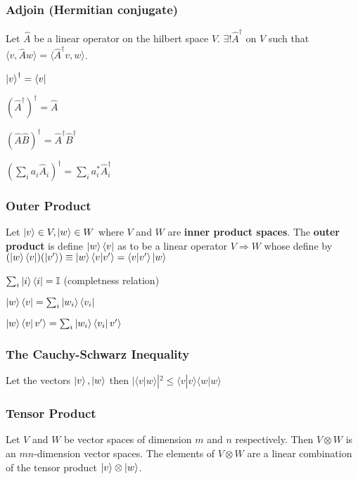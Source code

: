 \documentclass[5pt]{article}
\begin{document}
\begin{multicols}{3}
\subsubsection{Adjoin \small{(Hermitian conjugate)}}
Let $\hat{A}$ be a linear operator on the hilbert space $V$. 
$\exists! \hat{A}^\dagger$ on $V$ such that $\langle v, \hat{A}w\rangle=\langle\hat{A}^\dagger v, w\rangle$.

\begin{properties}
     \begin{itemize*}
          \item $\ket{v}^\dag=\bra{v}\;$
          \item $(\hat{A}^\dag)^\dag=\hat{A}$
          \item $(\hat{A}\hat{B})^\dagger=\hat{A}^\dagger\hat{B}^\dagger\;\:$     
          \item $(\sum_ia_i\hat{A}_i)^\dag=\sum_i a_i^*\hat{A}_i^\dag$
     \end{itemize*}
\end{properties}

\subsubsection{Outer Product}
Let $\ket{v}\in V, \ket{w}\in W$ where $V$ and $W$ are \textbf{inner product spaces}.
The \textbf{outer product} is define $\ket{w}\bra{v}$ as to be a linear operator $V\Rightarrow W$ whose define by
$(\ket{w}\bra{v})(\ket{v'})\equiv\ket{w}\langle v|v'\rangle=\langle v|v'\rangle\ket{w}$\\
\begin{properties}
     \begin{itemize*}
          \item $\sum_i\ket{i}\bra{i}=\mathbb{I}$ (completness relation)
          \item $\ket{w}\bra{v}=\sum_i\ket{w_i}\bra{v_i}$
          \item $\ket{w}\bra{v} v'\rangle =\sum_i\ket{w_i}\bra{v_i}v'\rangle$
     \end{itemize*}
\end{properties}

\subsubsection{The Cauchy-Schwarz Inequality}
Let the vectors $\ket{v},\ket{w}$ then $|\langle v|w\rangle|^2\leq \langle v|v\rangle\langle w|w\rangle$


\subsubsection{Tensor Product}
Let $V$ and $W$ be vector spaces of dimension $m$ and $n$ respectively.
Then $V\otimes W$ is an $mn$-dimension vector spaces. 
The elements of $V\otimes W$ are a linear combination of the tensor product $\ket{v}\otimes\ket{w}$.


\end{multicols}
\end{document}
